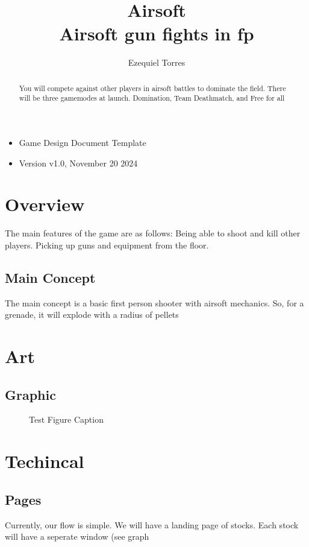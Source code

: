 \documentclass{report}
\title{Airsoft \large \\
Airsoft gun fights in fp}
\author{Ezequiel Torres}
\begin{document}
\maketitle 
\begin{itemize}
    \item Game Design Document Template
    \item Version v1.0, November 20 2024 \\
\end{itemize}
\newpage

\begin{abstract}
You will compete against other players in airsoft battles to dominate the field. There will be three gamemodes at launch. Domination, Team Deathmatch, and Free for all
\end{abstract}
\chapter{Overview}

The main features of the game are as follows: Being able to shoot and kill other players. Picking up guns and equipment from the floor.

\section{Main Concept}
The main concept is a basic first person shooter with airsoft mechanics. So, for a grenade, it will explode with a radius of pellets

\chapter{Art}
\section{Graphic}
\begin{figure}[h]
\centering
\caption{Test Figure Caption}
\end{figure}

\chapter{Techincal}
\section{Pages}
Currently, our flow is simple. We will have a landing page of stocks. Each stock will have a seperate window (see graph 
\end{document}
